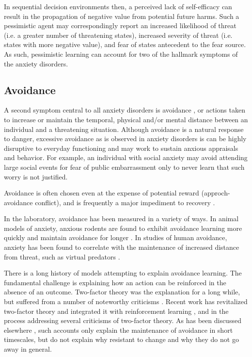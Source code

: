 \documentclass[11pt]{article} %
\begin{document}
In sequential decision environments then, a perceived lack of self-efficacy can
result in the propagation of negative value from potential future harms. Such a
pessimistic agent may correspondingly report an increased likelihood of threat
(i.e. a greater number of threatening states), increased severity of threat (i.e.
states with more negative value), and fear of states antecedent to the fear source.
As such, pessimistic learning can account for two of the hallmark symptoms of
the anxiety disorders.

\subsection{Avoidance}

A second symptom central to all anxiety disorders is avoidance \citep{dsm5,
Krypotos2015, Arnaudova2017}, or actions taken to increase or maintain the temporal,
physical and/or mental distance between an individual and a threatening situation.
Although avoidance is a natural response to danger, excessive avoidance as is
observed in anxiety disorders is can be highly disruptive to everyday functioning
\cite{Salter2004} and may work to sustain anxious appraisals and behavior. For
example, an individual with social anxiety may avoid attending large social events
for fear of public embarrassment only to never learn that such worry is not justified.

Avoidance is often chosen even at the expense of potential reward (approch-avoidance
conflict), and is frequently a major impediment to recovery \citep{Arnaudova2017}.

In the laboratory, avoidance has been measured in a variety of ways. In animal
models of anxiety, anxious rodents are found to exhibit avoidance learning more
quickly and maintain avoidance for longer \citep{servatius2008}. In studies of
human avoidance, anxiety has been found to correlate with the maintenance of
increased distance from threat, such as virtual predators \citep{Bach2014, Bach2017,
Sheynin2014}.


There is a long history of models attempting to explain avoidance learning. The
fundamental challenge is explaining how an action can be reinforced in the
absence of an outcome. Two-factor theory was the explanation for a long while,
but suffered from a number of noteworthy criticisms \citep{Krypotos2015}.
Recent work has revitalized two-factor theory and integrated it with reinforcement
learning \citep{Moutoussis2008, Maia2010}, and in the process addressing several
criticisms of two-factor theory. As has been discussed elsewhere \citep{Moutoussis2017},
such accounts only explain the maintenance of avoidance in short timescales, but
do not explain why resistant to change and why they do not go away in general.
\end{document}
